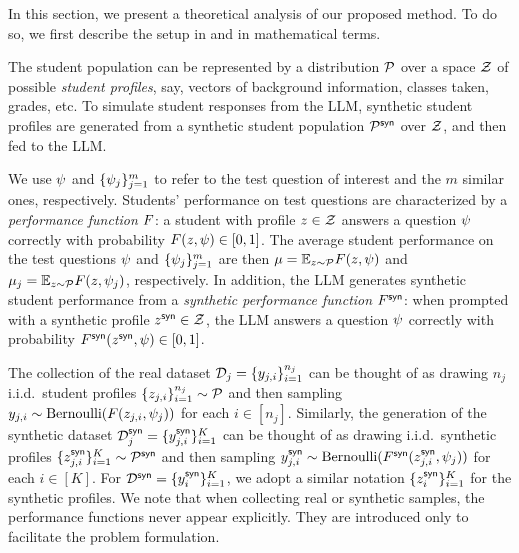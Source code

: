 In this section, we present a theoretical analysis of our proposed method. To do so, we first describe the setup in  and  in mathematical terms.

The student population can be represented by a distribution $\mathcal{P}$ over a space $\mathcal{Z}$ of possible \emph{student profiles}, say, vectors of background information, classes taken, grades, etc. To simulate student responses from the LLM, synthetic student profiles are generated from a synthetic student population $\mathcal{P}^{\mathsf{syn}}$ over $\mathcal{Z}$, and then fed to the LLM.

We use $\psi$ and $\{ \psi_j \}_{j=1}^m$ to refer to the test question of interest and the $m$ similar ones, respectively. 
Students' performance on test questions are characterized by a \emph{performance function} $F$: a student with profile $z\in\mathcal{Z}$ answers a question $\psi$ correctly with probability $F ( z , \psi ) \in [0, 1]$. The average student performance on the test questions $\psi$ and $\{ \psi_j \}_{j=1}^m$ are then $\mu = \mathbb{E}_{z \sim \mathcal{P} } F ( z ,  \psi ) $ and $\mu_j = \mathbb{E}_{z \sim \mathcal{P} } F (  z, \psi_j ) $, respectively.
In addition, the LLM generates synthetic student performance from a \emph{synthetic performance function} $F^{\mathsf{syn}}$: when prompted with a synthetic profile $z^{\mathsf{syn}}\in\mathcal{Z}$, the LLM answers a question $\psi$ correctly with probability $F^{\mathsf{syn}} ( z^{\mathsf{syn}} , \psi ) \in [0, 1]$. 

The collection of the real dataset $\mathcal{D}_j = \{ y_{j,i} \}_{i=1}^{n_j}$ can be thought of as drawing $n_j$ i.i.d.~student profiles $\{ z_{j,i} \}_{i=1}^{n_j} \sim \mathcal{P}$ and then sampling $y_{j,i} \sim \mathrm{Bernoulli} (  F ( z_{j,i} , \psi_j  ) )$ for each $i\in[n_j]$. Similarly, the generation of the synthetic dataset $\mathcal{D}^{\mathsf{syn}}_j = \{ y^{\mathsf{syn}}_{j,i} \}_{i=1}^{K}$ can be thought of as drawing i.i.d.~synthetic profiles $\{ z^{\mathsf{syn}}_{j,i} \}_{i=1}^{K} \sim \mathcal{P}^{\mathsf{syn}}$ and then sampling $y^{\mathsf{syn}}_{j,i} \sim \mathrm{Bernoulli} ( 
F^{\mathsf{syn}}
( z^{\mathsf{syn}}_{j,i} , \psi_j  ) )$ for each $i\in [K]$. For  $\mathcal{D}^{\mathsf{syn}} = \{ y^{\mathsf{syn}}_i \}_{i=1}^K$, we adopt a similar notation $\{ z^{\mathsf{syn}}_i \}_{i=1}^K$ for the synthetic profiles. We note that when collecting real or synthetic samples, the performance functions never appear explicitly. They are introduced only to facilitate the problem formulation.

